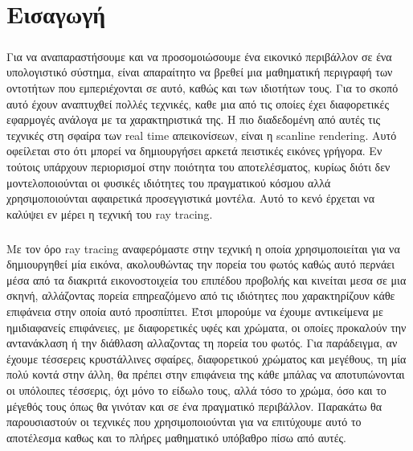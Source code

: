 \chapter{Εισαγωγή}

\ifpdf
    \graphicspath{{Introduction/IntroductionFigs/PNG/}{Introduction/IntroductionFigs/PDF/}{Introduction/IntroductionFigs/}}
\else
    \graphicspath{{Introduction/IntroductionFigs/EPS/}{Introduction/IntroductionFigs/}}
\fi

\begin{sloppypar}

\paragraph{}
Για να αναπαραστήσουμε και να προσομοιώσουμε ένα εικονικό περιβάλλον σε ένα υπολογιστικό σύστημα,
είναι απαραίτητο να βρεθεί μια μαθηματική περιγραφή των οντοτήτων που εμπεριέχονται σε αυτό, 
καθώς και των ιδιοτήτων τους. Για το σκοπό αυτό έχουν αναπτυχθεί πολλές τεχνικές,
καθε μια από τις οποίες έχει διαφορετικές εφαρμογές ανάλογα με τα χαρακτηριστικά της. Η πιο
διαδεδομένη από αυτές τις τεχνικές στη σφαίρα των real time απεικονίσεων, είναι η scanline 
rendering. Αυτό οφείλεται στο ότι μπορεί να δημιουργήσει αρκετά πειστικές εικόνες γρήγορα. 
Εν τούτοις υπάρχουν περιορισμοί στην ποιότητα του αποτελέσματος, κυρίως διότι δεν μοντελοποιούνται 
οι φυσικές ιδιότητες του πραγματικού κόσμου αλλά χρησιμοποιούνται αφαιρετικά προσεγγιστικά μοντέλα. 
Αυτό το κενό έρχεται να καλύψει εν μέρει η τεχνική του ray tracing.

\paragraph{}
Με τον όρο ray tracing αναφερόμαστε στην τεχνική η οποία χρησιμοποιείται για να δημιουργηθεί μία
εικόνα, ακολουθώντας την πορεία του φωτός καθώς αυτό περνάει μέσα από τα διακριτά εικονοστοιχεία 
του επιπέδου προβολής και κινείται μεσα σε μια σκηνή, αλλάζοντας πορεία επηρεαζόμενο από τις 
ιδιότητες που χαρακτηρίζουν κάθε επιφάνεια στην οποία αυτό προσπίπτει. Έτσι μπορούμε να έχουμε 
αντικείμενα με ημιδιαφανείς επιφάνειες, με διαφορετικές υφές και χρώματα, οι οποίες προκαλούν 
την αντανάκλαση ή την διάθλαση αλλαζοντας τη πορεία του φωτός. Για παράδειγμα, αν έχουμε τέσσερεις 
κρυστάλλινες σφαίρες, διαφορετικού χρώματος και μεγέθους, τη μία πολύ κοντά στην άλλη, θα πρέπει 
στην επιφάνεια της κάθε μπάλας να αποτυπώνονται οι υπόλοιπες τέσσερις, όχι μόνο το είδωλο τους, 
αλλά τόσο το χρώμα, όσο και το μέγεθός τους όπως θα γινόταν και σε ένα πραγματικό περιβάλλον. 
Παρακάτω θα παρουσιαστούν οι τεχνικές που χρησιμοποιούνται για να επιτύχουμε αυτό το αποτέλεσμα 
καθως και το πλήρες μαθηματικό υπόβαθρο πίσω από αυτές.

\end{sloppypar}
